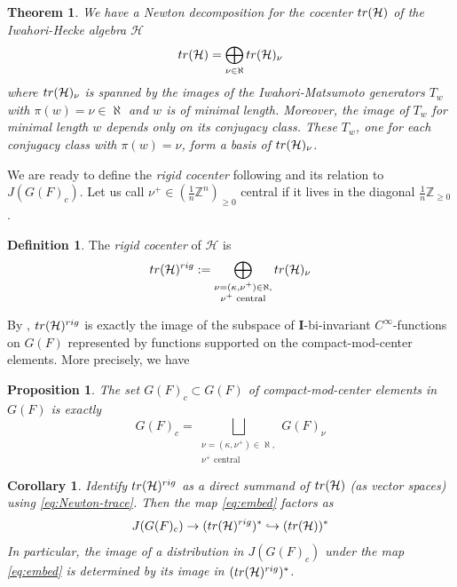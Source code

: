 \documentclass{amsart}
\numberwithin{equation}{section}
\newtheorem{theorem}[lemma]{Theorem}%
\newtheorem{corollary}[lemma]{Corollary}%
\newtheorem{proposition}[lemma]{Proposition}%
\theoremstyle{definition}
\newtheorem{definition}[lemma]{Definition}%
\def\tr{{\rm tr}}
\newcommand{\tW}{\widetilde{W}}
\newcommand{\cH}{\mathcal{H}}
\newcommand{\bI}{\mathbf{I}}
\newcommand{\Z}{{\mathbb Z}}
\begin{document}
\begin{theorem}
\label{thm:HN}
    We have a Newton decomposition for the cocenter $\tr(\cH)$ of the Iwahori-Hecke algebra $\cH$
    \begin{equation}\label{eq:Newton-trace}
    \tr(\cH)=\bigoplus_{\nu\in\aleph}\tr(\cH)_\nu
    \end{equation}
    where $\tr(\cH)_\nu$ is spanned by the images of the Iwahori-Matsumoto generators $T_w$ with $\pi(w)=\nu\in \aleph$ and $w$ is of minimal length. Moreover, the image of $T_w$ for minimal length $w$ depends only on its conjugacy class. These $T_w$, one for each conjugacy class with $\pi(w)=\nu$, form a basis of $\tr(\cH)_\nu$.
\end{theorem}


We are ready to define the {\em rigid cocenter} following \cite{HeCocenter} and its relation to $J(G(F)_c)$. Let us call $\nu^+\in(\frac{1}{n}\Z^n)_{\ge 0}$ central if it lives in the diagonal $\frac{1}{n}\Z_{\ge 0}$.

\begin{definition}
\label{def:rigtr}
    The {\em rigid cocenter} of $\cH$ is $$\tr(\cH)^{rig}:=\bigoplus_{\substack{\nu=(\kappa,\nu^+)\in \aleph, \\\nu^+ \text{ central}}} \tr(\cH)_\nu$$
\end{definition}
By \cite[Prop. 21]{HeCocenter}, $\tr(\cH)^{rig}$ is exactly the image of the subspace of $\bI$-bi-invariant $C^\infty$-functions on $G(F)$ represented by functions supported on the compact-mod-center elements. More precisely, we have
\begin{proposition}
\label{prop:cptnewton}
    The set $G(F)_c\subset G(F)$ of compact-mod-center elements in $G(F)$ is exactly 
    $$G(F)_c=\bigsqcup_{\substack{\nu=(\kappa,\nu^+)\in \aleph, \\\nu^+ \text{ central}}} G(F)_\nu$$
\end{proposition}

\begin{corollary}
\label{cor:factors} Identify $\tr(\cH)^{rig}$ as a direct summand of $\tr(\cH)$ (as vector spaces) using \eqref{eq:Newton-trace}. Then the map \eqref{eq:embed} factors as $$J(G(F)_c)\to (\tr(\cH)^{rig})^*\hookrightarrow (\tr(\cH))^*$$
In particular, the image of a distribution in $J(G(F)_c)$ under the map \eqref{eq:embed} is determined by its image in $(\tr(\cH)^{rig})^*$.
\end{corollary}
\end{document}
